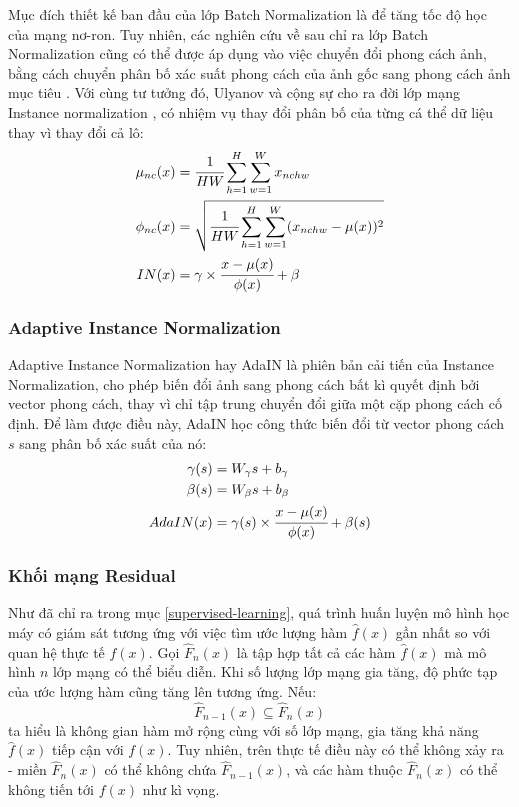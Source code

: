\documentclass[12pt]{extreport}
\begin{document}
Mục đích thiết kế ban đầu của lớp Batch Normalization là để tăng tốc độ học của mạng nơ-ron. Tuy nhiên, các nghiên cứu về sau chỉ ra lớp Batch Normalization cũng có thể được áp dụng vào việc chuyển đổi phong cách ảnh, bằng cách chuyển phân bố xác suất phong cách của ảnh gốc sang phong cách ảnh mục tiêu \cite{radford2015unsupervised}. Với cùng tư tưởng đó, Ulyanov và cộng sự cho ra đời lớp mạng Instance normalization \cite{DBLP:journals/corr/UlyanovVL16}, có nhiệm vụ thay đổi phân bố của từng cá thể dữ liệu thay vì thay đổi cả lô:
\begin{align*}
    \mu_{nc}(x)  & = \cfrac{1}{HW} \sum_{h = 1}^{H} \sum_{w = 1}^{W} x_{nchw}                     \\
    \phi_{nc}(x) & = \sqrt{\cfrac{1}{HW} \sum_{h = 1}^{H} \sum_{w = 1}^{W} (x_{nchw} - \mu(x))^2} \\
    IN(x)        & = \gamma \times \cfrac{x - \mu(x)}{\phi(x)} + \beta
\end{align*}

\subsubsection{Adaptive Instance Normalization}

Adaptive Instance Normalization hay AdaIN là phiên bản cải tiến của Instance Normalization, cho phép biến đổi ảnh sang phong cách bất kì quyết định bởi vector phong cách, thay vì chỉ tập trung chuyển đổi giữa một cặp phong cách cố định. Để làm được điều này, AdaIN học công thức biến đổi từ vector phong cách $ s $ sang phân bố xác suất của nó:
\begin{align*}
    \gamma(s) & = W_{\gamma}s + b_{\gamma}                                \\
    \beta(s)  & = W_{\beta}s + b_{\beta}                                  \\
    AdaIN(x)  & = \gamma(s) \times \cfrac{x - \mu(x)}{\phi(x)} + \beta(s)
\end{align*}

\subsubsection{Khối mạng Residual}

Như đã chỉ ra trong mục \ref{supervised-learning}, quá trình huấn luyện mô hình học máy có giám sát tương ứng với việc tìm ước lượng hàm $ \hat{f}(x) $ gần nhất so với quan hệ thực tế $ f(x) $. Gọi $ \hat{F}_n(x) $ là tập hợp tất cả các hàm $ \hat{f}(x) $ mà mô hình $ n $ lớp mạng có thể biểu diễn. Khi số lượng lớp mạng gia tăng, độ phức tạp của ước lượng hàm cũng tăng lên tương ứng. Nếu:
\begin{equation}
    \hat{F}_{n-1}(x) \subseteq \hat{F}_n(x)
    \label{eq:res}
\end{equation}
ta hiểu là không gian hàm mở rộng cùng với số lớp mạng, gia tăng khả năng $ \hat{f}(x) $ tiếp cận với $ f(x) $. Tuy nhiên, trên thực tế điều này có thể không xảy ra - miền $ \hat{F}_n(x) $ có thể không chứa $ \hat{F}_{n-1}(x) $, và các hàm thuộc $ \hat{F}_n(x) $ có thể không tiến tới $ f(x) $ như kì vọng.
\end{document}
